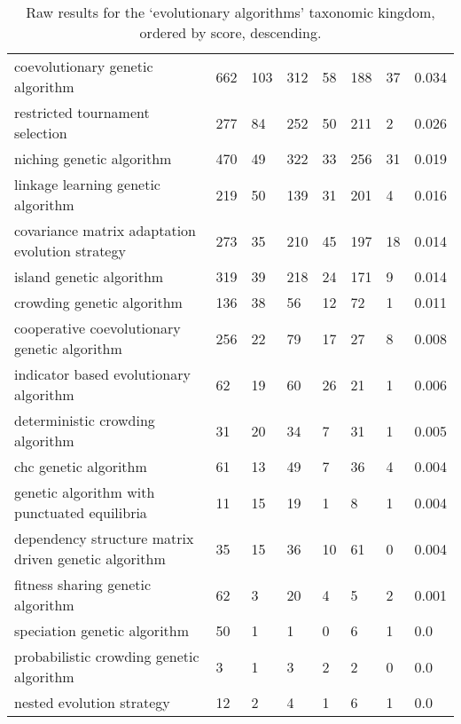 \documentclass[a4paper, 11pt]{article}
\begin{document}
\begin{table}[htp]
\begin{tabularx}{\textwidth}{Xlllllll}
		coevolutionary genetic algorithm & 662 & 103 & 312 & 58 & 188 & 37 & 0.034 \\
		restricted tournament selection & 277 & 84 & 252 & 50 & 211 & 2 & 0.026 \\
		niching genetic algorithm & 470 & 49 & 322 & 33 & 256 & 31 & 0.019 \\
		linkage learning genetic algorithm & 219 & 50 & 139 & 31 & 201 & 4 & 0.016 \\
		covariance matrix adaptation evolution strategy & 273 & 35 & 210 & 45 & 197 & 18 & 0.014 \\
		island genetic algorithm & 319 & 39 & 218 & 24 & 171 & 9 & 0.014 \\
		crowding genetic algorithm & 136 & 38 & 56 & 12 & 72 & 1 & 0.011 \\
		cooperative coevolutionary genetic algorithm & 256 & 22 & 79 & 17 & 27 & 8 & 0.008 \\
		indicator based evolutionary algorithm & 62 & 19 & 60 & 26 & 21 & 1 & 0.006 \\
		deterministic crowding algorithm & 31 & 20 & 34 & 7 & 31 & 1 & 0.005 \\
		chc genetic algorithm & 61 & 13 & 49 & 7 & 36 & 4 & 0.004 \\
		genetic algorithm with punctuated equilibria & 11 & 15 & 19 & 1 & 8 & 1 & 0.004 \\
		dependency structure matrix driven genetic algorithm & 35 & 15 & 36 & 10 & 61 & 0 & 0.004 \\
		fitness sharing genetic algorithm & 62 & 3 & 20 & 4 & 5 & 2 & 0.001 \\
		speciation genetic algorithm & 50 & 1 & 1 & 0 & 6 & 1 & 0.0 \\
		probabilistic crowding genetic algorithm & 3 & 1 & 3 & 2 & 2 & 0 & 0.0 \\
		nested evolution strategy & 12 & 2 & 4 & 1 & 6 & 1 & 0.0 \\
		\bottomrule
		\end{tabularx}	
	\caption{Raw results for the `evolutionary algorithms' taxonomic kingdom, ordered by score, descending.}
	\label{tab:evolutionary}
\end{table}
\end{document}

